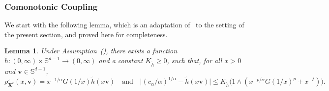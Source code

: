 \documentclass[en,oneside,bbfont,article]{amsart}
\newtheorem{lemma}[theorem]{Lemma}
\theoremstyle{remark}
\theoremstyle{definition}
\theoremstyle{definition}
\newcommand\Sp{\mathbb{S}}
\newcommand\1{\mathds{1}}
\newcommand\la{\leftarrow}
\renewcommand\le{\leqslant}
\renewcommand\ge{\geqslant}
\newcommand\co{\mathsf{c}}
\newcommand{\wt}[1]{\widetilde{#1}}
\begin{document}
\subsubsection{Comonotonic Coupling}
\label{sec:comono_technic_bound}

We start with the following lemma, which is an adaptation of~\cite[Lem.~4.10]{WassersteinPaper} to the setting of the present section, and proved here for completeness.

\begin{lemma}
\label{lem:bounds_h_2_multidim}
Under Assumption~(), there exists a function $\wt h:(0,\infty)\times \Sp^{d-1}\to (0,\infty)$ and a constant $K_{\wt h} \ge 0$, such that, for all $x>0$ and $\bm{v} \in \Sp^{d-1}$, 
\begin{equation}
\label{eq:rho_X^la}
\rho_{\bm{X}^\co}^{\la}(x,\bm{v})=x^{-1/\alpha}G(1/x)\wt h(x\bm{v}) \quad \text{and}\quad 
\big|( c_\alpha/\alpha )^{1/\alpha}-\wt h(x\bm{v})\big|
\le K_{\wt h}\big(1\wedge (x^{-p/\alpha}G(1/x)^p+x^{-\delta})\big).
\end{equation}
\end{lemma}
\end{document}
